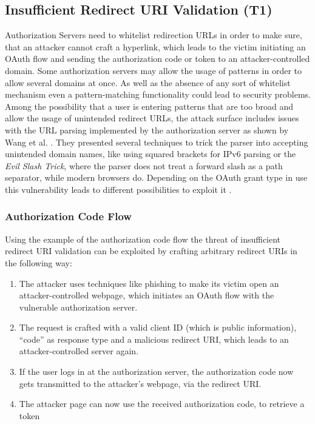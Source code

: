 \documentclass[
    fontsize=12pt,
    headings=small,
    parskip=half,           %
    bibliography=totoc,
    numbers=noenddot,       %
    open=any,               %
    ]{scrreprt}
\begin{document}
\subsection[Insufficient Redirect URI Validation]{Insufficient Redirect URI Validation (T1)}
\label{threat:T1}
Authorization Servers need to whitelist redirection URLs in order to make sure, that an attacker cannot craft a hyperlink, which leads to the victim initiating an OAuth flow and sending the authorization code or token to an attacker-controlled domain. Some authorization servers may allow the usage of patterns in order to allow several domains at once. As well as the absence of any sort of whitelist mechanism even a pattern-matching functionality could lead to security problems. Among the possibility that a user is entering
patterns that are too broad and allow the usage of unintended redirect URLs, the attack surface includes issues with the URL parsing implemented by the authorization server as shown by Wang et al. \cite{wang2019make}. They presented several techniques to trick the parser into accepting unintended domain names, like using squared brackets for IPv6 parsing or the \emph{Evil Slash Trick}, where the parser does not treat a forward slash as a path
separator, while modern browsers do. Depending on the OAuth grant type in use this vulnerability leads to different possibilities to exploit it \cite{lodderstedt2020oauth}.


\subsubsection{Authorization Code Flow}
Using the example of the authorization code flow the threat of insufficient redirect URI validation can be exploited by crafting arbitrary redirect URIs in the following way:

\begin{enumerate}
    \item The attacker uses techniques like phishing to make its victim open an
        attacker-controlled webpage, which initiates an OAuth flow with the
        vulnerable authorization server.
	
    \item The request is crafted with a valid client ID (which is public
        information), ``code'' as response type and a malicious redirect URI,
        which leads to an attacker-controlled server again.
	
    \item If the user logs in at the authorization server, the authorization
        code now gets transmitted to the attacker's webpage, via the redirect
        URI.
	
    \item The attacker page can now use the received authorization code, to
        retrieve a token 
\end{enumerate}
\end{document}
